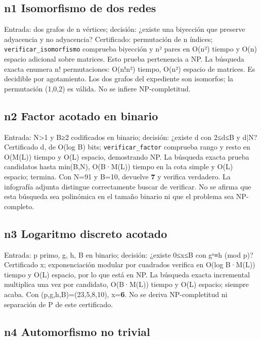 \documentclass[12pt,a4paper]{article}
\begin{document}
\subsection{n1 Isomorfismo de dos redes}

Entrada: dos grafos de n vértices; decisión: ¿existe una biyección que preserve adyacencia y no adyacencia? Certificado: permutación de n índices; \texttt{verificar\_isomorfismo} comprueba biyección y n² pares en O(n²) tiempo y O(n) espacio adicional sobre matrices. Esto prueba pertenencia a NP. La búsqueda exacta enumera n! permutaciones: O(n!n²) tiempo, O(n²) espacio de matrices. Es decidible por agotamiento. Los dos grafos del expediente son isomorfos; la permutación (1,0,2) es válida. No se infiere NP-completitud.


\subsection{n2 Factor acotado en binario}

Entrada: N>1 y B≥2 codificados en binario; decisión: ¿existe d con 2≤d≤B y d|N? Certificado d, de O(log B) bits; \texttt{verificar\_factor} comprueba rango y resto en O(M(L)) tiempo y O(L) espacio, demostrando NP. La búsqueda exacta prueba candidatos hasta min(B,N), O(B·M(L)) tiempo en la cota simple y O(L) espacio; termina. Con N=91 y B=10, devuelve \textbf{7} y verifica verdadero. La infografía adjunta distingue correctamente buscar de verificar. No se afirma que esta búsqueda sea polinómica en el tamaño binario ni que el problema sea NP-completo.


\subsection{n3 Logaritmo discreto acotado}

Entrada: p primo, g, h, B en binario; decisión: ¿existe 0≤x≤B con gˣ≡h (mod p)? Certificado x; exponenciación modular por cuadrados verifica en O(log B·M(L)) tiempo y O(L) espacio, por lo que está en NP. La búsqueda exacta incremental multiplica una vez por candidato, O(B·M(L)) tiempo y O(L) espacio; siempre acaba. Con (p,g,h,B)=(23,5,8,10), x=\textbf{6}. No se deriva NP-completitud ni separación de P de este certificado.


\subsection{n4 Automorfismo no trivial}
\end{document}
